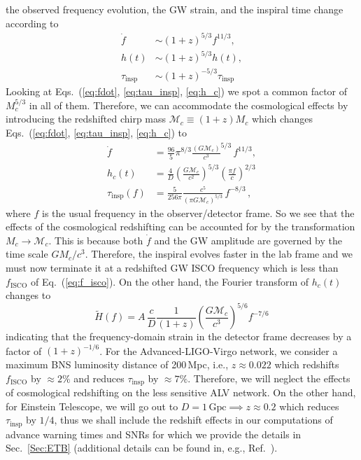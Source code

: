\documentclass[amsmath,amssymb,aps,floats,amsfonts,notitlepage,superscriptaddress,eqsecnum,nofootinbib,10pt]{revtex4-1}
\newcommand{\f}{\frac}
\newcommand{\be}{\begin{equation}}
\newcommand{\ee}{\end{equation}}
\begin{document}
\begin{enumerate}
the observed frequency evolution, the GW strain, and the inspiral time change according to %
\begin{align}
\dot{f}\ \ &\sim (1+z)^{5/3}{f}^{11/3},\\
h(t) & \sim (1+z)^{5/3} h(t),\\
\tau_\text{insp}& \sim (1+z)^{-5/3} \tau_{\text{insp}}
\end{align}
%
Looking at Eqs.~(\ref{eq:fdot}, \ref{eq:tau_insp}, \ref{eq:h_c}) we spot a common factor of $M_c^{5/3}$ in all of them.
Therefore, we can accommodate the cosmological effects by introducing the redshifted chirp mass $\mathcal{M}_c\equiv (1+z) M_c$
which changes Eqs.~(\ref{eq:fdot}, \ref{eq:tau_insp}, \ref{eq:h_c}) to
%
\begin{align}
\dot{f} &= \f{96}{5}\pi^{8/3} \f{(G \mathcal{M}_c)}{c^3}^{5/3}\, f^{11/3} \label{eq:fdot_redshifted},\\
h_c(t) & = \f{4}{D}\left(\f{G \mathcal{M}_c}{c^2}\right)^{5/3}\left(\frac{\pi f}{c}\right)^{2/3} \label{eq:strain_TD_redshifted}\\
\tau_\text{insp}(f) &= \f{5}{256\pi}\f{c^5}{(\pi G \mathcal{M}_c)^{5/3}} \,f^{-8/3}\label{eq:tau_insp_redshifted}\, ,
\end{align}
%
where $f$ is the usual frequency in the observer/detector frame.
So we see that the effects of the cosmological redshifting can be accounted for by the transformation $M_c\rightarrow \mathcal{M}_c$.
This is because both $\dot{f}$ and the GW amplitude are governed by the time scale $G M_c/c^3$.
Therefore, the inspiral evolves faster in the lab frame %
and we must now terminate it at a redshifted GW ISCO frequency which is less than $f_\text{ISCO}$ of Eq.~(\ref{eq:f_isco}).
On the other hand, the Fourier transform of $h_c(t)$ changes to 
%
\be
\tilde{H}(f) = A\, \f{c}{D} \f{1}{(1+z)} \left(\f{G \mathcal{M}_c}{c^3}\right)^{5/6} f^{-7/6}
\ee
indicating that the frequency-domain strain in the detector frame decreases by a factor of $(1+z)^{-1/6}$. %
%
For the Advanced-LIGO-Virgo network,
we consider a maximum BNS luminosity distance of 200\,Mpc, 
i.e., $z \approx 0.022$ which redshifts $f_\text{ISCO}$ by $\approx 2\%$ and reduces $\tau_\text{insp}$ by $\approx 7\%$.
Therefore, we will neglect the effects of cosmological redshifting on the less sensitive ALV network.
On the other hand, for Einstein Telescope, we will go out to $D=1\,\text{Gpc}\implies z\approx 0.2$
which reduces $\tau_\text{insp}$ by $1/4$, thus we shall include the redshift effects in our computations of advance warning times and SNRs
for which we provide the details in Sec.~\ref{Sec:ETB} (additional details can be found in, e.g., Ref.~\cite{Phinney:2001di}). 


\end{enumerate}
\end{document}
